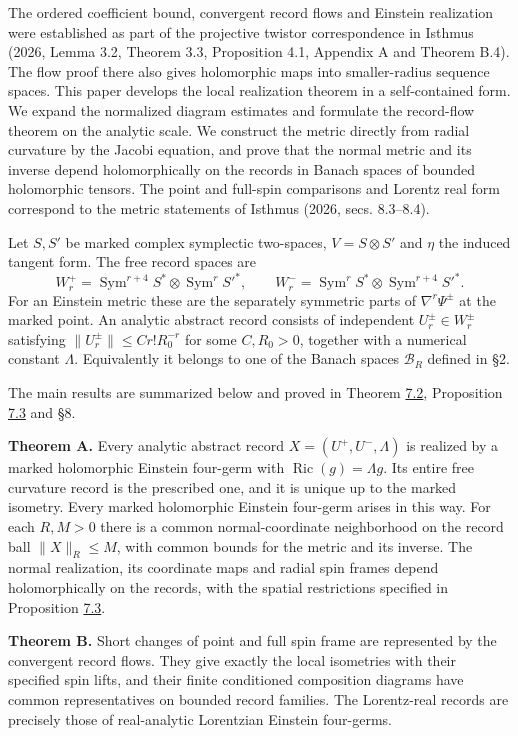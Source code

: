 \documentclass[
  english,
  11pt,
  reqno]{amsart}
\begin{document}
The ordered coefficient bound, convergent record flows and Einstein
realization were established as part of the projective twistor
correspondence in Isthmus (2026, Lemma 3.2, Theorem 3.3, Proposition
4.1, Appendix A and Theorem B.4). The flow proof there also gives
holomorphic maps into smaller-radius sequence spaces. This paper
develops the local realization theorem in a self-contained form. We
expand the normalized diagram estimates and formulate the record-flow
theorem on the analytic scale. We construct the metric directly from
radial curvature by the Jacobi equation, and prove that the normal
metric and its inverse depend holomorphically on the records in Banach
spaces of bounded holomorphic tensors. The point and full-spin
comparisons and Lorentz real form correspond to the metric statements of
Isthmus (2026, secs. 8.3--8.4).

Let \(S,S'\) be marked complex symplectic two-spaces, \(V=S\otimes S'\)
and \(\eta\) the induced tangent form. The free record spaces are \[
 W_r^+=\operatorname{Sym}^{r+4}S^*\otimes\operatorname{Sym}^{r}S'^*,
 \qquad W_r^-=\operatorname{Sym}^{r}S^*\otimes\operatorname{Sym}^{r+4}S'^*.
\] For an Einstein metric these are the separately symmetric parts of
\(\nabla^r\Psi^\pm\) at the marked point. An analytic abstract record
consists of independent \(U_r^\pm\in W_r^\pm\) satisfying
\(\|U_r^\pm\|\le Cr!R_0^{-r}\) for some \(C,R_0>0\), together with a
numerical constant \(\Lambda\). Equivalently it belongs to one of the
Banach spaces \(\mathcal B_R\) defined in §2.

The main results are summarized below and proved in Theorem
\hyperref[thm:es-realization]{7.2}, Proposition
\hyperref[prop:es-uniform-realization]{7.3} and §8.

\textbf{Theorem A.} Every analytic abstract record
\(X=(U^+,U^-,\Lambda)\) is realized by a marked holomorphic Einstein
four-germ with \(\operatorname{Ric}(g)=\Lambda g\). Its entire free
curvature record is the prescribed one, and it is unique up to the
marked isometry. Every marked holomorphic Einstein four-germ arises in
this way. For each \(R,M>0\) there is a common normal-coordinate
neighborhood on the record ball \(\|X\|_R\le M\), with common bounds for
the metric and its inverse. The normal realization, its coordinate maps
and radial spin frames depend holomorphically on the records, with the
spatial restrictions specified in Proposition
\hyperref[prop:es-uniform-realization]{7.3}.

\textbf{Theorem B.} Short changes of point and full spin frame are
represented by the convergent record flows. They give exactly the local
isometries with their specified spin lifts, and their finite conditioned
composition diagrams have common representatives on bounded record
families. The Lorentz-real records are precisely those of real-analytic
Lorentzian Einstein four-germs.
\end{document}
